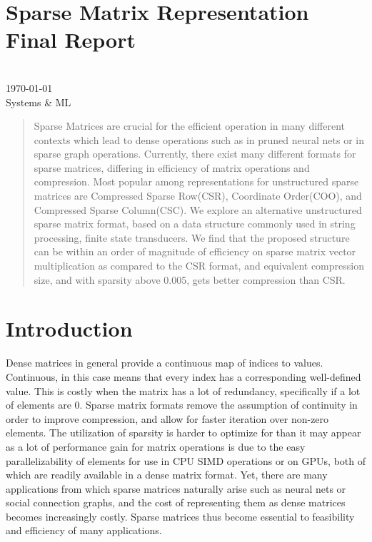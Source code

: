 \documentclass[12pt]{article}
\begin{document}
\section*{Sparse Matrix Representation Final Report}
\author*{Julian Knodt} \\
\today \\
Systems \& ML

\begin{abstract}
Sparse Matrices are crucial for the efficient operation in many different contexts which lead to
dense operations such as in pruned neural nets or in sparse graph operations. Currently, there
exist many different formats for sparse matrices, differing in efficiency of matrix operations
and compression. Most popular among representations for unstructured sparse matrices are
Compressed Sparse Row(CSR), Coordinate Order(COO), and Compressed Sparse Column(CSC). We explore
an alternative unstructured sparse matrix format, based on a data structure commonly used in
string processing, finite state transducers. We find that the proposed structure can be within
an order of magnitude of efficiency on sparse matrix vector multiplication as compared to the
CSR format, and equivalent compression size, and with sparsity above 0.005, gets better
compression than CSR.
\end{abstract}

\section*{Introduction}
Dense matrices in general provide a continuous map of indices to values. Continuous, in this
case means that every index has a corresponding well-defined value. This is costly when the matrix has a
lot of redundancy, specifically if a lot of elements are $0$. Sparse matrix formats remove the assumption
of continuity in order to improve compression, and allow for faster iteration over non-zero
elements. The utilization of sparsity is harder to optimize for than it may appear as a lot of
performance gain for matrix operations is due to the easy parallelizability of elements for use
in CPU SIMD operations or on GPUs, both of which are readily available in a dense matrix
format. Yet, there are many applications from which sparse matrices naturally arise such as
neural nets or social connection graphs, and the cost of representing them as dense matrices
becomes increasingly costly. Sparse matrices thus become essential to feasibility and efficiency
of many applications.
\end{document}

